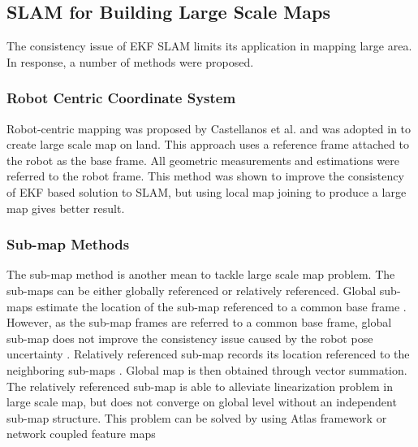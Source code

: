 \subsection{SLAM for Building Large Scale Maps}
The consistency issue of EKF SLAM limits its application in mapping
large area. In response, a number of methods were proposed.

\subsubsection{Robot Centric Coordinate System}
Robot-centric mapping was proposed by Castellanos et al.
\cite{castellanos_limits_2004} and was adopted in
\cite{civera_1-point_2009} to create large scale map on land. This
approach uses a reference frame attached to the robot as the base
frame. All geometric measurements and estimations were referred to the
robot frame. This method was shown to improve the consistency of EKF
based solution to SLAM, but using local map joining to produce a large
map gives better result.

\subsubsection{Sub-map Methods}
The sub-map method is another mean to tackle large scale map problem.
The sub-maps can be either globally referenced or relatively
referenced. Global sub-maps estimate the location of the sub-map
referenced to a common base frame \cite{estrada_hierarchical_2005}
\cite{leonard_consistent_2003}. However, as the sub-map frames are
referred to a common base frame, global sub-map does not improve the
consistency issue caused by the robot pose
uncertainty \cite{bailey_simultaneous_2006}. Relatively referenced
sub-map records its location referenced to the neighboring sub-maps
\cite{chong_feature-based_1999} \cite{williams_efficient_2001}. Global
map is then obtained through vector summation. The relatively
referenced sub-map is able to alleviate linearization problem in large
scale map, but does not converge on global level without an
independent sub-map structure. This problem can be solved by using
Atlas framework or network coupled feature maps \cite{bosse_slam_2004}
\cite{bailey_mobile_2002}

